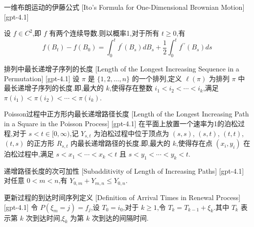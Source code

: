 \documentclass[UTF8]{ctexart}
\begin{document}
    
    
    \begin{thm}
        {一维布朗运动的伊藤公式}
        [Ito's Formula for One-Dimensional Brownian Motion]
        [gpt-4.1]
        
设 $f \in C^{2}$,即 $f$ 有两个连续导数.则以概率1,对于所有 $t \geq 0$,有
\[
f( B_{t} ) - f( B_{0} ) = \int_{0}^{t} f^{\prime}( B_{s} ) d B_{s} + \frac{1}{2} \int_{0}^{t} f^{\prime\prime}( B_{s} ) d s
\]

    \end{thm}
    
    
    
    \begin{dfn}
        {排列中最长递增子序列的长度}
        [Length of the Longest Increasing Sequence in a Permutation]
        [gpt-4.1]
        设 $\pi$ 是 $\{1,2,\ldots,n\}$ 的一个排列,定义 $\ell(\pi)$ 为排列 $\pi$ 中最长递增子序列的长度.即,最大的 $k$,使得存在整数 $i_{1} < i_{2} < \cdots < i_{k}$,满足 $\pi(i_{1}) < \pi(i_{2}) < \cdots < \pi(i_{k})$.
    \end{dfn}
    
    
    
    \begin{dfn}
        {Poisson过程中正方形内最长递增路径长度}
        [Length of the Longest Increasing Path in a Square in the Poisson Process]
        [gpt-4.1]
        在平面上放置一个速率为1的泊松过程,对于 $s < t \in [0,\infty)$,记 $Y_{s,t}$ 为泊松过程中位于顶点为 $(s,s)$, $(s,t)$, $(t,t)$, $(t,s)$ 的正方形 $R_{s,t}$ 内最长递增路径的长度.即,最大的 $k$,使得存在点 $(x_{i}, y_{i})$ 在泊松过程中,满足 $s < x_{1} < \cdots < x_{k} < t$ 且 $s < y_{1} < \cdots < y_{k} < t$.
    \end{dfn}
    
    
    
    \begin{ppt}
        {递增路径长度的次可加性}
        [Subadditivity of Length of Increasing Paths]
        [gpt-4.1]
        对任意 $0 < m < n$,有 $Y_{0,m} + Y_{m,n} \le Y_{0,n}$.
    \end{ppt}
    
    
    
    \begin{dfn}
        {更新过程的到达时间序列定义}
        [Definition of Arrival Times in Renewal Process]
        [gpt-4.1]
        令 $P(\xi_{m} = j) = f_{j}$,设 $T_{0} = i_{0}$,对于 $k \geq 1$,令 $T_{k} = T_{k-1} + \xi_{k}$.其中 $T_{k}$ 表示第 $k$ 次到达时间,$\xi_{k}$ 为第 $k$ 次到达的间隔时间.
    \end{dfn}
    
\end{document}
